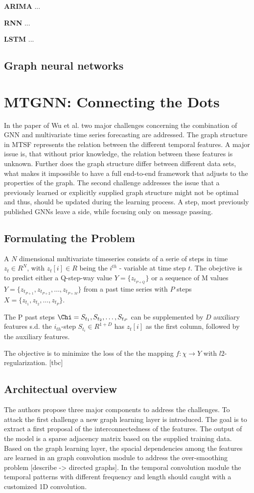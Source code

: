 \documentclass[letterpaper,twocolumn,11pt]{article}
\begin{document}
\textbf{ARIMA} ...

\textbf{RNN} ...

\textbf{LSTM}  ...

\subsection{Graph neural networks}

\section{MTGNN: Connecting the Dots}
In the paper of Wu et al. \cite{wu2020connecting} two major challenges concerning the combination of GNN and multivariate
time series forecasting are addressed.
The graph structure in MTSF represents the relation between the different temporal features.
A major issue is, that without prior knowledge, the relation between these features is unknown.
Further does the graph structure differ between different data sets, what makes it impossible to have a full end-to-end framework that adjusts to the properties of the graph.
The second challenge addresses the issue that a previously learned or explicitly supplied graph structure might not be optimal and thus,
should be updated during the learning process.
A step, most previously published GNNs leave a side, while focusing only on message passing.

\subsection{Formulating the Problem}
A $N$ dimensional multivariate timeseries consists of a serie of steps in time $z_t \in R^N$, with $z_t[i] \in R$
being the $i^{th}$ - variable at time step $t$. The obejctive is to predict either a Q-step-way value
$Y = \{z_{t_{P+Q}}\}$ or a sequence of M values $Y = \{z_{t_{P+1}}, z_{t_{P+2}},\dots,z_{t_{P+M}}\}$
from a past time series with $P$ steps $X = \{z_{t_{1}}, z_{t_{2}},\dots,z_{t_{P}}\}$.

The P past steps  $\Chi = {S_{t_1}, S_{t_2}, \dots, S_{t_P}}$ can be supplemented by $D$ auxiliary features s.d. the $i_{th}$-step
$S_{t_i} \in R^{1+D}$ has $z_t[i]$ as the first column, followed by the auxiliary features.

The objective is to minimize the loss of the the mapping $f: \chi \rightarrow Y$ with $l2$-regularization. [tbc]
\subsection{Architectual overview}
The authors propose three major components to address the challenges. To attack the first challenge a new graph learning layer
is introduced. The goal is to extract a first proposal of the interconnectedness of the features. The output of the model is a sparse adjacency matrix based on the supplied training data.
Based on the graph learning layer, the spacial dependencies among the features are learned in an graph convolution module to address the over-smoothing problem [describe -> directed graphs].
In the temporal convolution module the temporal patterns with different frequency and length should caught with a customized 1D convolution.
\end{document}
